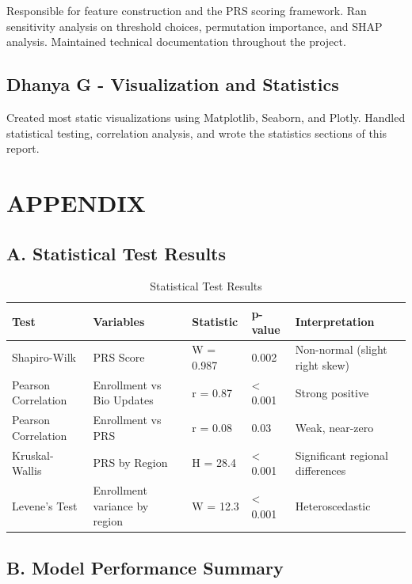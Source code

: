 \documentclass[11pt, a4paper]{article}
\begin{document}
Responsible for feature construction and the PRS scoring framework. Ran sensitivity analysis on threshold choices, permutation importance, and SHAP analysis. Maintained technical documentation throughout the project.


\subsection{Dhanya G - Visualization and Statistics}

Created most static visualizations using Matplotlib, Seaborn, and Plotly. Handled statistical testing, correlation analysis, and wrote the statistics sections of this report.




\clearpage
\section*{APPENDIX}

\subsection{A. Statistical Test Results}

\vspace{0.8em}
\begin{table}[H]
\caption{Statistical Test Results}
{\small
\begin{tabularx}{\textwidth}{|Y|Y|Y|Y|Y|}
\hline
\textbf{Test} & \textbf{Variables} & \textbf{Statistic} & \textbf{p-value} & \textbf{Interpretation} \\ \hline
Shapiro-Wilk & PRS Score & W = 0.987 & 0.002 & Non-normal (slight right skew) \\ \hline
Pearson Correlation & Enrollment vs Bio Updates & r = 0.87 & < 0.001 & Strong positive \\ \hline
Pearson Correlation & Enrollment vs PRS & r = 0.08 & 0.03 & Weak, near-zero \\ \hline
Kruskal-Wallis & PRS by Region & H = 28.4 & < 0.001 & Significant regional differences \\ \hline
Levene's Test & Enrollment variance by region & W = 12.3 & < 0.001 & Heteroscedastic \\ \hline
\end{tabularx}
}
\end{table}
\vspace{1em}

\subsection{B. Model Performance Summary}
\end{document}
